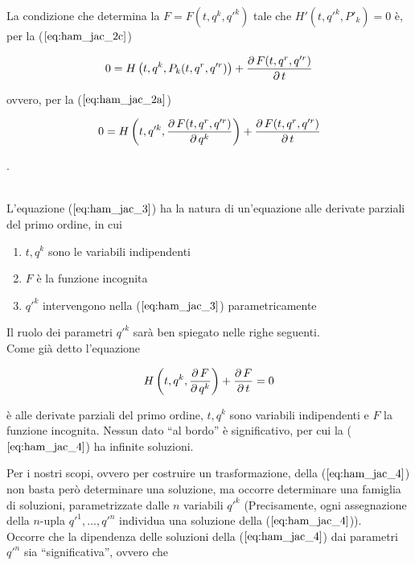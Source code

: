 La condizione che determina la $F=F(t,q^k,q'^k)$ tale che $H'(t,q'^k,P'_k)=0$ è, per la ($ \ref{eq:ham_jac_2c} $)

\begin{equation*}
0=H \left( t,q^k,P_k(t,q^r,q'^r) \right) + \frac{\operatorname{\partial} F(t,q^r,q'^r)}{\operatorname{\partial} t}
\end{equation*}

ovvero, per la ($ \ref{eq:ham_jac_2a} $)

\begin{equation} \label{eq:ham_jac_3}
0=H \left( t,q'^k,\frac{\operatorname{\partial} F(t,q^r,q'^r)}{\operatorname{\partial} q^k} \right) + \frac{\operatorname{\partial} F(t,q^r,q'^r)}{\operatorname{\partial} t}
\end{equation}

\begin{footnotesize}
.
\end{footnotesize}
\\

L'equazione ($ \ref{eq:ham_jac_3} $) ha la natura di un'equazione alle derivate parziali del primo ordine, in cui

\begin{enumerate}
\item[] $t,q^k$ sono le variabili indipendenti
\item[] $F$ è la funzione incognita
\item[] $q'^k$ intervengono nella ($ \ref{eq:ham_jac_3} $) parametricamente
\end{enumerate}

Il ruolo dei parametri $q'^k$ sarà ben spiegato nelle righe seguenti.\\


Come già detto l'equazione

\begin{equation} \label{eq:ham_jac_4}
H \left( t,q^k,\frac{\operatorname{\partial} F}{\operatorname{\partial} q^k} \right) + \frac{\operatorname{\partial} F}{\operatorname{\partial} t}=0
\end{equation}

è alle derivate parziali del primo ordine, $ t, q^k $ sono variabili indipendenti e $ F $ la funzione incognita. Nessun dato ``al bordo'' è significativo, per cui la ($ \ref{eq:ham_jac_4} $) ha infinite soluzioni.

Per i nostri scopi,  ovvero per costruire un trasformazione, della ($ \ref{eq:ham_jac_4} $) non basta però determinare una soluzione, ma occorre determinare una famiglia di soluzioni, parametrizzate dalle $n$ variabili $q'^k$ (Precisamente, ogni assegnazione della $n$-upla $q'^1,\dots,q'^n$ individua una soluzione della ($ \ref{eq:ham_jac_4} $)).\\
Occorre che la dipendenza delle soluzioni della ($ \ref{eq:ham_jac_4} $) dai parametri $q'^n$ sia ``significativa'', ovvero che

